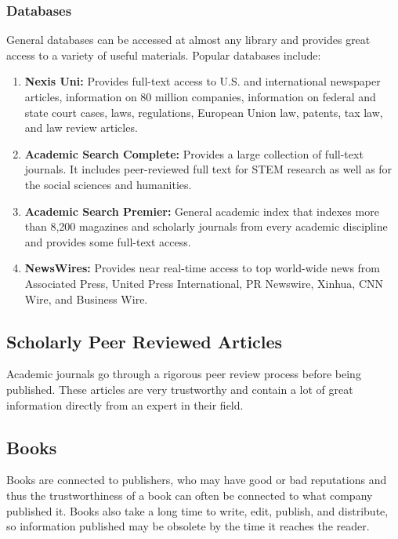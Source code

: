 \documentclass{report}
\begin{document}
            \subsubsection{Databases}
                General databases can be accessed at almost any library and provides great access to a variety of useful materials. Popular databases include:
                \begin{enumerate}
                    \item \textbf{Nexis Uni:} Provides full-text access to U.S. and international newspaper articles, information on 80 million companies, information on federal and state court cases, laws, regulations, European Union law, patents, tax law, and law review articles.
                    \item \textbf{Academic Search Complete:} Provides a large collection of full-text journals. It includes peer-reviewed full text for STEM research as well as for the social sciences and humanities.
                    \item \textbf{Academic Search Premier:} General academic index that indexes more than 8,200 magazines and scholarly journals from every academic discipline and provides some full-text access.
                    \item \textbf{NewsWires:} Provides near real-time access to top world-wide news from Associated Press, United Press International, PR Newswire, Xinhua, CNN Wire, and Business Wire.
                \end{enumerate}

        \subsection{Scholarly Peer Reviewed Articles}
            Academic journals go through a rigorous peer review process before being published. These articles are very trustworthy and contain a lot of great information directly from an expert in their field.

        \subsection{Books}
            Books are connected to publishers, who may have good or bad reputations and thus the trustworthiness of a book can often be connected to what company published it. Books also take a long time to write, edit, publish, and distribute, so information published may be obsolete by the time it reaches the reader.
\end{document}
